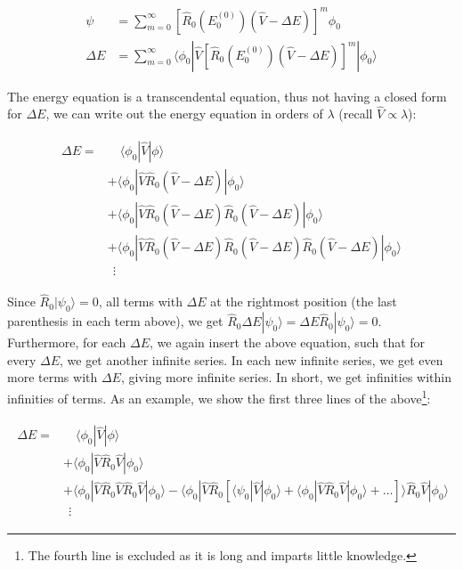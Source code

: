 \documentclass[10pt]{report}
\begin{document}
	\begin{align}
		\psi &= \sum_{m=0}^\infty \left[ \hat{R}_0(E_0^{(0)})(\hat{V} - \Delta E) \right]^m\phi_0 \\
		\Delta E &= \sum_{m=0}^\infty \langle\phi_0|\hat{V}\left[ \hat{R}_0(E_0^{(0)})(\hat{V} - \Delta E) \right]^m|\phi_0\rangle
	\end{align}
	
	The energy equation is a transcendental equation, thus not having a closed form for $\Delta E$, we can write out the energy equation in orders of $\lambda$ (recall $\hat{V}\propto\lambda$):
	
	\begin{align}
		\begin{split}
			\Delta E = &\quad\langle\phi_0|\hat{V}|\phi\rangle \\
			&+ \langle\phi_0|\hat{V}\hat{R}_0(\hat{V}-\Delta E)|\phi_0\rangle\\
			&+ \langle\phi_0|\hat{V}\hat{R}_0(\hat{V}-\Delta E)\hat{R}_0(\hat{V}-\Delta E)|\phi_0\rangle\\
			&+ \langle\phi_0|\hat{V}\hat{R}_0(\hat{V}-\Delta E)\hat{R}_0(\hat{V}-\Delta E)\hat{R}_0(\hat{V}-\Delta E)|\phi_0\rangle\\
			&\:\:\vdots
		\end{split}
	\end{align}
	
	Since $\hat{R}_0|\psi_0\rangle = 0$, all terms with $\Delta E$ at the rightmost position (the last parenthesis in each term above), we get $\hat{R}_0\Delta E|\psi_0\rangle = \Delta E\hat{R}_0|\psi_0\rangle = 0$. Furthermore, for each $\Delta E$, we again insert the above equation, such that for every $\Delta E$, we get another infinite series. In each new infinite series, we get even more terms with $\Delta E$, giving more infinite series. In short, we get infinities within infinities of terms. As an example, we show the first three lines of the above\footnote{The fourth line is excluded as it is long and imparts little knowledge.}:
	
	\begin{align}
		\begin{split}
			\Delta E = &\quad\langle\phi_0|\hat{V}|\phi\rangle \\
			&+ \langle\phi_0|\hat{V}\hat{R}_0\hat{V}|\phi_0\rangle\\
			&+ \langle\phi_0|\hat{V}\hat{R}_0\hat{V}\hat{R}_0\hat{V}|\phi_0\rangle - \langle\phi_0|\hat{V}\hat{R}_0\left[\langle\psi_0|\hat{V}|\phi_0\rangle + \langle\phi_0|\hat{V}\hat{R}_0\hat{V}|\phi_0\rangle + \ldots\right]\rangle\hat{R}_0\hat{V}|\phi_0\rangle\\
			&\:\:\vdots
		\end{split}
	\end{align}
	
\end{document}
